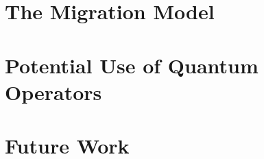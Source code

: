 \documentclass[11pt,reqno]{amsart}
\numberwithin{equation}{section}
\theoremstyle{plain}
\begin{document}
\section{The Migration Model}
\section{Potential Use of Quantum Operators}
\section{Future Work}


 \appendix






\end{document}
